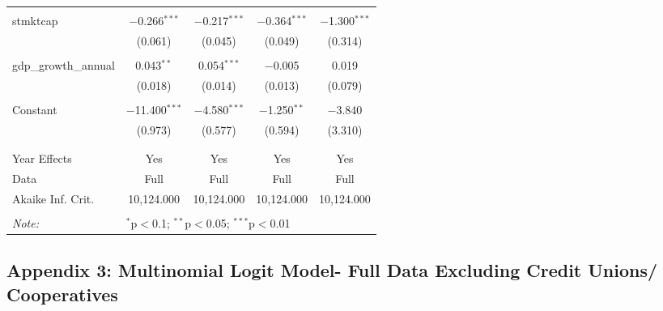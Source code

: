 \documentclass[a4paper,nobind]{templates/ociamthesis}
\begin{document}
\begin{table}[!htbp]
\begin{tabular}{@{\extracolsep{5pt}}lcccc}
  & & & & \\ 
 stmktcap & $-$0.266$^{***}$ & $-$0.217$^{***}$ & $-$0.364$^{***}$ & $-$1.300$^{***}$ \\ 
  & (0.061) & (0.045) & (0.049) & (0.314) \\ 
  & & & & \\ 
 gdp\_growth\_annual & 0.043$^{**}$ & 0.054$^{***}$ & $-$0.005 & 0.019 \\ 
  & (0.018) & (0.014) & (0.013) & (0.079) \\ 
  & & & & \\ 
 Constant & $-$11.400$^{***}$ & $-$4.580$^{***}$ & $-$1.250$^{**}$ & $-$3.840 \\ 
  & (0.973) & (0.577) & (0.594) & (3.310) \\ 
  & & & & \\ 
\hline \\[-1.8ex] 
Year Effects & Yes & Yes & Yes & Yes \\ 
Data & Full & Full & Full & Full \\ 
Akaike Inf. Crit. & 10,124.000 & 10,124.000 & 10,124.000 & 10,124.000 \\ 
\hline 
\hline \\[-1.8ex] 
\textit{Note:}  & \multicolumn{4}{l}{$^{*}$p$<$0.1; $^{**}$p$<$0.05; $^{***}$p$<$0.01} \\ 
\end{tabular} 
\end{table}

\newpage

\hypertarget{appendix-3-multinomial-logit-model--full-data-excluding-credit-unions-cooperatives}{%
\subsection{Appendix 3: Multinomial Logit Model- Full Data Excluding Credit Unions/ Cooperatives}\label{appendix-3-multinomial-logit-model--full-data-excluding-credit-unions-cooperatives}}
\end{document}
